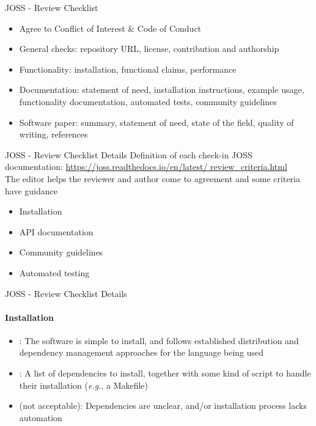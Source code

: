 \begin{frame}{JOSS - Review Checklist}

\begin{itemize}
    \item Agree to Conflict of Interest \& Code of Conduct
    \item General checks: repository URL, license,
contribution and authorship
    \item Functionality: installation, functional claims,
performance
\item Documentation: statement of need, installation
instructions, example usage, functionality
documentation, automated tests, community
guidelines
\item Software paper: summary, statement of need,
state of the field, quality of writing, references
\end{itemize}
    
\end{frame}


\begin{frame}{JOSS - Review Checklist Details}
Definition of each check-in JOSS documentation:
\url{https://joss.readthedocs.io/en/latest/
review_criteria.html}\\
\vspace{0.5cm}
The editor helps the reviewer and author come to
agreement and some criteria have guidance
\vspace{0.5cm}
\begin{itemize}
    \item Installation
    \item API documentation
    \item Community guidelines
    \item Automated testing
\end{itemize}
    
\end{frame}

\begin{frame}{JOSS - Review Checklist Details}
\framesubtitle{Installation}

\begin{itemize}
    \item {}: The software is simple to install, and
follows established distribution and dependency
management approaches for the language
being used
\item {}: A list of dependencies to install, together
with some kind of script to handle their
installation (\emph{e.g.}, a Makefile)
\item {} (not acceptable): Dependencies are unclear,
and/or installation process lacks automation
\end{itemize}
    
\end{frame}

